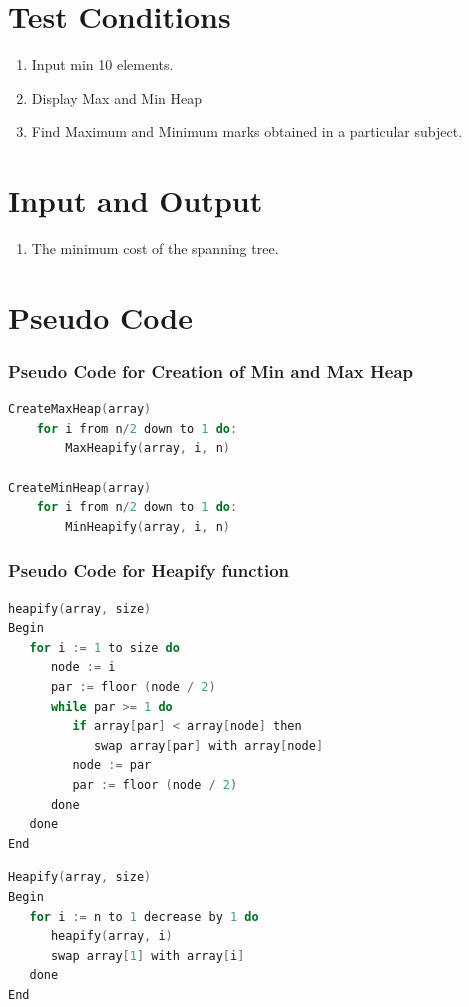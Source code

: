 \documentclass[11pt]{article}
\begin{document}
\section{Test Conditions}
\begin{enumerate}
    \item Input min 10 elements.
    \item Display Max and Min Heap
    \item Find Maximum and Minimum marks obtained in a particular subject.
\end{enumerate}

\section{Input and Output}
\begin{enumerate}
    \item The minimum cost of the spanning tree.
\end{enumerate}

\section{Pseudo Code}
\subsubsection*{Pseudo Code for Creation of Min and Max Heap}
\begin{lstlisting}[language=c++]
CreateMaxHeap(array)
    for i from n/2 down to 1 do:
        MaxHeapify(array, i, n)

CreateMinHeap(array)
    for i from n/2 down to 1 do:
        MinHeapify(array, i, n)

\end{lstlisting}
\subsubsection*{Pseudo Code for Heapify function}
\begin{lstlisting}[language=c++]
heapify(array, size)
Begin
   for i := 1 to size do
      node := i
      par := floor (node / 2)
      while par >= 1 do
         if array[par] < array[node] then
            swap array[par] with array[node]
         node := par
         par := floor (node / 2)
      done
   done
End

\end{lstlisting}

\begin{lstlisting}[language=C++]
Heapify(array, size)
Begin
   for i := n to 1 decrease by 1 do
      heapify(array, i)
      swap array[1] with array[i]
   done
End
\end{lstlisting}
\end{document}
